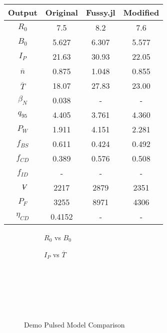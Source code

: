\begin{table}[h!]
\begin{subtable}[t]{0.5\textwidth}
\begin{tabular}{ c|c|c|c }
Output           & Original         & Fussy.jl  & Modified      \\  
\hline
$R_{0}$          & 7.5              & 8.2  &  7.6        \\
$B_{0}$          & 5.627            & 6.307  & 5.577         \\
$I_{P}$          & 21.63            & 30.93   &  22.05       \\
$\overline n$    & 0.875           & 1.048   & 0.855        \\
$\overline T$    & 18.07            & 27.83    &  23.00       \\
$\beta_{N}$       & 0.038            & - & -         \\
$q_{95}$         & 4.405            & 3.761 &   4.360         \\
$P_{W}$          & 1.911            & 4.151 &    2.281       \\
$f_{BS}$         & 0.611            & 0.424  &  0.492       \\
$f_{CD}$         & 0.389            & 0.576 &  0.508        \\
$f_{ID}$         & -              & -             & - \\
$\volume$         & 2217           & 2879 &  2351        \\
$P_{F}$          & 3255           & 8971 & 4306         \\
$\eta_{CD}$      & 0.4152           & -  & -        \\

\end{tabular}
\end{subtable}
\hfill
\hfill
\label{table:demo_steady}
\end{table}

\clearpage

\newpage

\begin{figure*}[h!]
    \centering
    \hfill 
    \begin{subfigure}[t]{0.45\textwidth}
        \centering
    \begin{adjustbox}{width=\textwidth}
      \Large
      
    \end{adjustbox}
        \caption{$R_0$ vs $B_0$}
    \end{subfigure}
    \hfill
    \begin{subfigure}[t]{0.45\textwidth}
        \centering
    \begin{adjustbox}{width=\textwidth}
      \Large
      
    \end{adjustbox}
        \caption{$I_P$ vs $\overline T$}
    \end{subfigure}
    \hfill \hfill ~\\ ~\\ ~\\
    \caption{Demo Pulsed Model Comparison} ~\\
    \label{fig:demo_pulsed_comparison}
\end{figure*}

